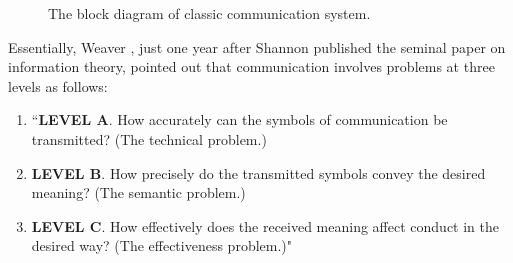 \documentclass[12pt, draftclsnofoot,onecolumn]{IEEEtran}
\begin{document}
\begin{figure}[htbp]
\setlength{\abovecaptionskip}{0.cm}
\setlength{\belowcaptionskip}{-0.cm}
  \caption{The block diagram of classic communication system.}\label{model_classic_comm}
\end{figure}

Essentially, Weaver \cite{Semantic_Weaver}, just one year after Shannon published the seminal paper on information theory, pointed out that communication involves problems at three levels as follows:
\begin{enumerate}[]
  \item  ``\textbf{LEVEL A}. How accurately can the symbols of communication be transmitted? (The technical problem.)
  \item  \textbf{LEVEL B}. How precisely do the transmitted symbols convey the desired meaning? (The semantic problem.)
  \item  \textbf{LEVEL C}. How effectively does the received meaning affect conduct in the desired way? (The effectiveness problem.)"
\end{enumerate}
\end{document}
